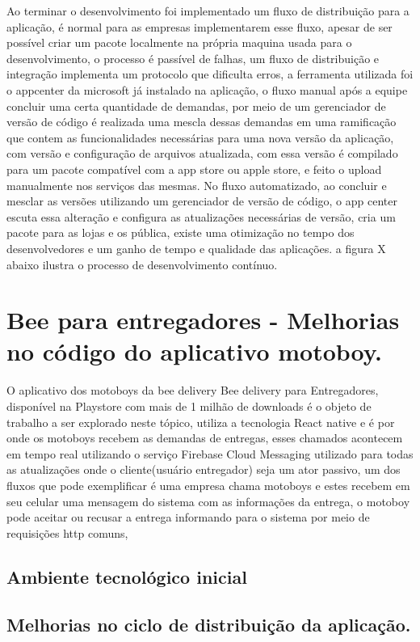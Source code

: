 \documentclass{ufersa}
\begin{document}
Ao terminar o desenvolvimento foi implementado um fluxo de distribuição para a aplicação, é normal para as empresas implementarem esse fluxo, apesar de ser possível criar um pacote localmente na própria maquina usada para o desenvolvimento, o processo é passível de falhas, um fluxo de distribuição e integração implementa um protocolo que dificulta erros, a ferramenta utilizada foi o appcenter da microsoft já instalado na aplicação, o fluxo manual após a equipe concluir uma certa quantidade de demandas, por meio de um gerenciador de versão de código é realizada uma mescla dessas demandas em uma ramificação que contem as funcionalidades necessárias para uma nova versão da aplicação, com versão e configuração de arquivos atualizada, com essa versão é compilado para um pacote compatível com a app store ou apple store, e feito o upload manualmente nos serviços das mesmas. No fluxo automatizado, ao concluir e mesclar as versões utilizando um gerenciador de versão de código, o app center escuta essa alteração e configura as atualizações necessárias de versão, cria um pacote para as lojas e os pública, existe uma otimização no tempo dos desenvolvedores e um ganho de tempo e qualidade das aplicações.  a figura X abaixo ilustra o processo de desenvolvimento contínuo.
\section{Bee para entregadores - Melhorias no código do aplicativo motoboy.}

O aplicativo dos motoboys da bee delivery Bee delivery para Entregadores, disponível na Playstore com mais de 1 milhão de downloads é o objeto de trabalho a ser explorado neste tópico, utiliza a tecnologia React native e é por onde os motoboys recebem as demandas de entregas, esses chamados acontecem em tempo real utilizando o serviço Firebase Cloud Messaging utilizado para todas as atualizações onde o cliente(usuário entregador) seja um ator passivo, um dos fluxos que pode exemplificar é uma empresa chama motoboys e estes recebem em seu celular uma mensagem do sistema com as informações da entrega, o motoboy pode aceitar ou recusar a entrega informando para o sistema por meio de requisições http comuns, 
\subsection{Ambiente tecnológico inicial}
\subsection{Melhorias no ciclo de distribuição da aplicação.}
\end{document}
